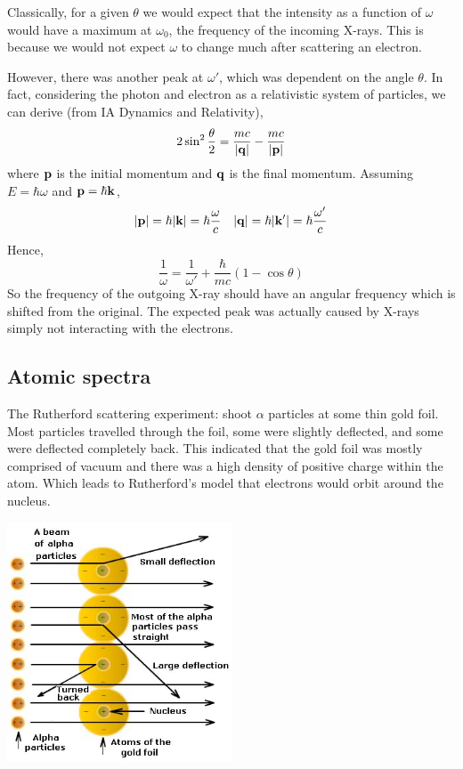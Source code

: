 \documentclass[a4paper]{article}
\begin{document}
Classically, for a given \( \theta \) we would expect that the intensity as a function of \( \omega \) would have a maximum at \( \omega_0 \), the frequency of the incoming X-rays.
This is because we would not expect \( \omega \) to change much after scattering an electron.

However, there was another peak at \( \omega' \), which was dependent on the angle \( \theta \).
In fact, considering the photon and electron as a relativistic system of particles, we can derive (from IA Dynamics and Relativity),
\[
	2 \sin^2 \frac{\theta}{2} = \frac{mc}{\abs{\vb q}} - \frac{mc}{\abs{\vb p}}
\]
where \( \vb p \) is the initial momentum and \( \vb q \) is the final momentum.
Assuming \( E = \hbar \omega \) and \( \vb p = \hbar \vb k \),
\[
	\abs{\vb p} = \hbar \abs{\vb k} = \hbar \frac{\omega}{c}\quad \abs{\vb q} = \hbar \abs{\vb k'} = \hbar\frac{\omega'}{c}
\]
Hence,
\[
	\frac{1}{\omega} = \frac{1}{\omega'} + \frac{\hbar}{mc}(1-\cos\theta)
\]
So the frequency of the outgoing X-ray should have an angular frequency which is shifted from the original.
The expected peak was actually caused by X-rays simply not interacting with the electrons.

\subsection{Atomic spectra}
The Rutherford scattering experiment: shoot \( \alpha \) particles at some thin gold foil.
Most particles travelled through the foil, some were slightly deflected, and some were deflected completely back.
This indicated that the gold foil was mostly comprised of vacuum and there was a high density of positive charge within the atom. 
Which leads to Rutherford's model that electrons would orbit around the nucleus.

\begin{center}
    \includegraphics[width=0.5\textwidth]{qm5.png}
\end{center}
\end{document}
